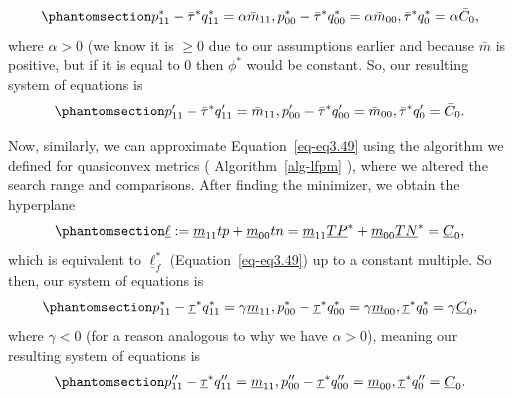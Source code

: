 \documentclass[
  letterpaper,
  numbers=noenddot,
  DIV=11]{scrreprt}
\theoremstyle{plain}
\theoremstyle{definition}
\theoremstyle{plain}
\theoremstyle{remark}
\begin{document}
\begin{equation}\phantomsection\label{eq-eq3.52}{p_{11}^{*}-\bar{\tau}^{*} q_{11}^{*}=\alpha \bar{m}_{11}, p_{00}^{*}-\bar{\tau}^{*} q_{00}^{*}=\alpha \bar{m}_{00}, \bar{\tau}^{*} q_{0}^{*}=\alpha \bar{C}_{0},}\end{equation}
where \(\alpha > 0\) (we know it is \(\geq0\) due to our assumptions
earlier and because \(\bar{m}\) is positive, but if it is equal to \(0\)
then \(\phi^*\) would be constant. So, our resulting system of equations
is \begin{equation}\phantomsection\label{eq-eq3.53}{\begin{aligned}
    p_{11}^{\prime}-\bar{\tau}^{*} q_{11}^{\prime}=\bar{m}_{11}, p_{00}^{\prime}-\bar{\tau}^{*} q_{00}^{\prime}=\bar{m}_{00}, \bar{\tau}^{*} q_{0}^{\prime}=\bar{C}_{0}.
\end{aligned}}\end{equation}

Now, similarly, we can approximate Equation~\ref{eq-eq3.49} using the
algorithm we defined for quasiconvex metrics
( Algorithm~\ref{alg-lfpm} ), where we altered the search range and
comparisons. After finding the minimizer, we obtain the hyperplane
\begin{equation}\phantomsection\label{eq-eq3.54}{\underline{\ell}:=\underline{m}_{11} t p+\underline{m}_{00} t n=\underline{m}_{11} \underline{TP}^{*}+\underline{m}_{00} \underline{TN}^{*} = \underline{C}_{0},}\end{equation}
which is equivalent to \(\underline{\ell}_{f}^{*}\)
(Equation~\ref{eq-eq3.49}) up to a constant multiple. So then, our
system of equations is
\begin{equation}\phantomsection\label{eq-eq3.55}{p_{11}^{*}-\underline{\tau}^{*} q_{11}^{*}=\gamma \underline{m}_{11}, p_{00}^{*}-\underline{\tau}^{*} q_{00}^{*}=\gamma \underline{m}_{00}, \underline{\tau}^{*} q_{0}^{*}=\gamma \underline{C}_{0},}\end{equation}
where \(\gamma <0\) (for a reason analogous to why we have
\(\alpha >0\)), meaning our resulting system of equations is
\begin{equation}\phantomsection\label{eq-eq3.56}{\begin{aligned}
    p_{11}^{\prime \prime}-\underline{\tau}^{*} q_{11}^{\prime \prime}=\underline{m}_{11}, p_{00}^{\prime \prime}-\underline{\tau}^{*} q_{00}^{\prime \prime}=\underline{m}_{00}, \underline{\tau}^{*} q_{0}^{\prime \prime}=\underline{C}_{0}.
\end{aligned}}\end{equation}
\end{document}

